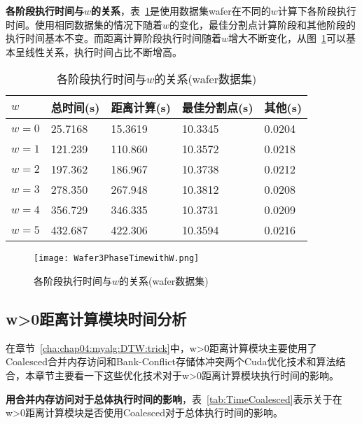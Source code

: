 \textbf{各阶段执行时间与$w$的关系}，表~\ref{tab:Timewithw}是使用数据集wafer在不同的$w$计算下各阶段执行时间。使用相同数据集的情况下随着$w$的变化，最佳分割点计算阶段和其他阶段的执行时间基本不变。而距离计算阶段执行时间随着$w$增大不断变化，从图~\ref{fig:Wafer3PhaseTimewithW}可以基本呈线性关系，执行时间占比不断增高。

\begin{table}[htbp]
	\centering
	\begin{minipage}{0.9\textwidth}
		\caption{各阶段执行时间与$w$的关系(wafer数据集)}
		\label{tab:Timewithw}
		\begin{tabular}{p{2cm}p{2cm}p{2cm}p{3cm}p{2cm}}
			\toprule[1.5pt]
			 {\heiti $w$ } &{\heiti 总时间(s) } &{\heiti 距离计算(s) } &{\heiti 最佳分割点(s) } &{\heiti 其他(s) }
			\\\midrule[1pt]			
			$w=0$ & 25.7168 & 15.3619 & 10.3345 & 0.0204\\
			$w=1$ & 121.239 & 110.860 & 10.3572 & 0.0218\\
			$w=2$ & 197.362 & 186.967 & 10.3738 & 0.0212\\
			$w=3$ & 278.350 & 267.948 & 10.3812 & 0.0208\\
			$w=4$ & 356.729 & 346.335 & 10.3731 & 0.0209\\
			$w=5$ & 432.687 & 422.306 & 10.3594 & 0.0216\\
			\bottomrule[1.5pt]
		\end{tabular}
	\end{minipage}
\end{table}

\begin{figure}[H] %
	\centering
	\texttt{[image: Wafer3PhaseTimewithW.png]}
	\caption{各阶段执行时间与$w$的关系(wafer数据集)}
	\label{fig:Wafer3PhaseTimewithW}
\end{figure}

\subsection{w>0距离计算模块时间分析}

在章节~\ref{cha:chap04:myalg:DTW:trick}中，w>0距离计算模块主要使用了Coalesced合并内存访问和Bank-Conflict存储体冲突两个Cuda优化技术和算法结合，本章节主要看一下这些优化技术对于w>0距离计算模块执行时间的影响。

\textbf{用合并内存访问对于总体执行时间的影响}，表~\ref{tab:TimeCoalesced}表示关于在w>0距离计算模块是否使用Coalesced对于总体执行时间的影响。

